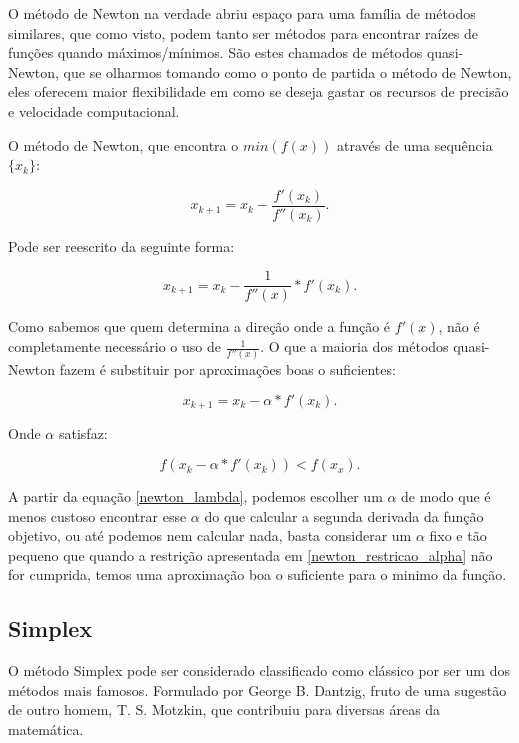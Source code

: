 O método de Newton na verdade abriu espaço para uma família de métodos
similares, que como visto, podem tanto ser métodos para encontrar raízes de
funções quando máximos/mínimos. São estes chamados de métodos quasi-Newton, que
se olharmos tomando como o ponto de partida o método de Newton, eles oferecem
maior flexibilidade em como se deseja gastar os recursos de precisão e
velocidade computacional.

O método de Newton, que encontra o \(min(f(x))\) através de uma sequência
\(\{x_k\}\):

\begin{equation}
    x_{k+1} = x_{k} - \frac {f'(x_{k})}{f''(x_{k})}.
\end{equation}

Pode ser reescrito da seguinte forma:

\begin{equation}
    x_{k+1} = x_{k} -  \frac{1}{f''(x)} * f'(x_{k}).
\end{equation}


Como sabemos que quem determina a direção onde a função é \(f'(x)\), não é
completamente necessário o uso de \( \frac{1}{f''(x)} \). O que a maioria dos
métodos quasi-Newton fazem é substituir por aproximações boas o suficientes:

\begin{equation}
    x_{k+1} = x_{k} -  \alpha * f'(x_{k}).
    \label{newton_lambda}
\end{equation}

Onde \(\alpha\) satisfaz:

\begin{equation}
    f(x_{k} -  \alpha * f'(x_{k})) < f(x_{x}).
    \label{newton_restricao_alpha}
\end{equation}

A partir da equação \ref{newton_lambda}, podemos escolher um \(\alpha\) de modo
que é menos custoso encontrar esse \(\alpha\) do que calcular a segunda
derivada da função objetivo, ou até podemos nem calcular nada, basta considerar
um \(\alpha\) fixo e tão pequeno que quando a restrição apresentada em
\ref{newton_restricao_alpha} não for cumprida, temos uma aproximação boa o
suficiente para o minimo da função.



\subsection{Simplex}

\hspace{0.8cm}
O método Simplex pode ser considerado classificado como clássico por ser um
dos métodos mais famosos. Formulado por George B. Dantzig, fruto de uma
sugestão de outro homem, T. S. Motzkin, que contribuiu para diversas áreas da
matemática.

